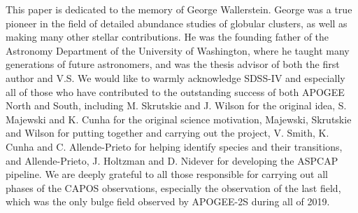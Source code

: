 \documentclass[onecolumn]{aa}
\begin{document}
\begin{acknowledgements}
This paper is dedicated to the memory of George Wallerstein. George was a true pioneer in the field of detailed abundance studies of globular clusters, 
as well as making many other stellar contributions. He was the founding father of the Astronomy Department of the University of Washington, where he taught many generations of future astronomers, and was the thesis advisor of both the first author and V.S.
We would like to warmly acknowledge SDSS-IV and especially all of those who have contributed to the outstanding success of both APOGEE North and South, including M. Skrutskie and J. Wilson for the original idea, S. Majewski and K. Cunha for the original science motivation, Majewski, Skrutskie and Wilson for putting together and carrying out the project, V. Smith, K. Cunha and C. Allende-Prieto for helping identify species and their transitions, and Allende-Prieto, J. Holtzman and D. Nidever for developing the ASPCAP pipeline. We are deeply grateful to all those responsible for carrying out all phases of the CAPOS observations, especially the observation of the last field, which was the only bulge field observed by APOGEE-2S during all of 2019.


\end{acknowledgements}
\end{document}
